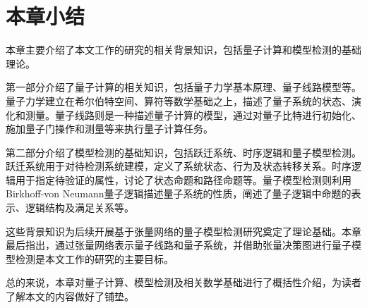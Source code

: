 \section{本章小结}
本章主要介绍了本文工作的研究的相关背景知识，包括量子计算和模型检测的基础理论。

第一部分介绍了量子计算的相关知识，包括量子力学基本原理、量子线路模型等。量子力学建立在希尔伯特空间、算符等数学基础之上，描述了量子系统的状态、演化和测量。量子线路则是一种描述量子计算的模型，通过对量子比特进行初始化、施加量子门操作和测量等来执行量子计算任务。

第二部分介绍了模型检测的基础知识，包括跃迁系统、时序逻辑和量子模型检测。跃迁系统用于对待检测系统建模，定义了系统状态、行为及状态转移关系。时序逻辑用于指定待验证的属性，讨论了状态命题和路径命题等。量子模型检测则利用Birkhoff-von Neumann量子逻辑描述量子系统的性质，阐述了量子逻辑中命题的表示、逻辑结构及满足关系等。

这些背景知识为后续开展基于张量网络的量子模型检测研究奠定了理论基础。本章最后指出，通过张量网络表示量子线路和量子系统，并借助张量决策图进行量子模型检测是本文工作的研究的主要目标。

总的来说，本章对量子计算、模型检测及相关数学基础进行了概括性介绍，为读者了解本文的内容做好了铺垫。